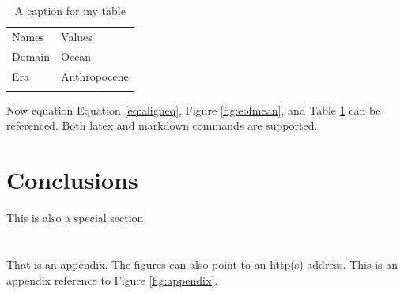 \documentclass[cp, manuscript]{copernicus}
\begin{document}
\begin{table}[t]
\centering
\caption{A caption for my table}
\label{tab:gulf}
\begin{tabular}{ll}
  \tophline
  Names & Values \\
  \middlehline
  Domain & Ocean \\
  Era & Anthropocene \\
  \bottomhline
\end{tabular}
\belowtable{}
\end{table}

Now equation Equation \ref{eq:aligneq}, Figure \ref{fig:eofmean}, and
Table \ref{tab:gulf} can be referenced. Both latex and markdown commands
are supported.

\section{Conclusions}\label{conclusions}

This is also a special section.


\appendix

\section{}\label{appendix-1} %
That is an appendix. The figures can also point to an http(s) address.
This is an appendix reference to Figure \ref{fig:appendix}.
\end{document}
